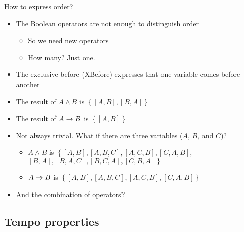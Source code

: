 \documentclass{beamer}
\def\xbeforeop{\ensuremath\rightarrow}
\newcommand{\xbefore}[2]{\ensuremath #1 \xbeforeop #2 }
\begin{document}
\begin{frame}[label=expressorder]{How to express order?}
	\begin{itemize}
		\item The Boolean operators are not enough to distinguish order
		\begin{itemize}
			\item So we need new operators
			\item How many? Just one.
		\end{itemize}
		\item The exclusive before (XBefore) expresses that one variable comes before another \hyperlink{xbeforedefs}{}
		\item The result of $A\land B$ is
		$\left\{
			\left[A,B\right],
			\left[B,A\right]
		\right\}$
		\item The result of $\xbefore{A}{B}$ is
		$\left\{
			\left[A,B\right]
		\right\}$
		\item Not always trivial. What if there are three variables ($A$, $B$, and $C$)?
		\begin{itemize}
			\item $A\land B$ is 
				$\left\{
					\left[A,B\right],
					\left[A,B,C\right], 
					\left[A,C,B\right],
					\left[C,A,B\right],\right. $
					$\left.
						\left[B,A\right],
						\left[B,A,C\right], 
						\left[B,C,A\right],
						\left[C,B,A\right]
					\right\}$
			\item $\xbefore{A}{B}$ is 
				$\left\{
					\left[A,B\right], 
					\left[A,B,C\right], 
					\left[A,C,B\right],
					\left[C,A,B\right]
				\right\} $
		\end{itemize}
		\item And the combination of operators?
	\end{itemize}
\end{frame}

\subsection{Tempo properties}
\end{document}
